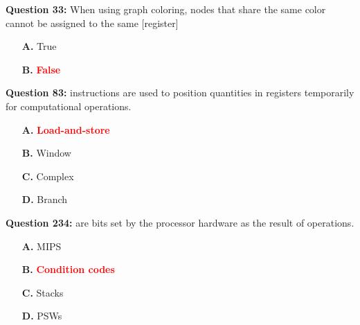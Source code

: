 \documentclass[12pt,a4paper]{article}
\begin{document}
\vspace{0.5cm}

\vspace{0.5cm}

\textbf{Question 33:} When using graph coloring, nodes that share the same color cannot be assigned to the same [register]

\begin{itemize}
    \item[\textbf{A.}] True
    \item[\textbf{B.}] \textcolor{red}{\textbf{False}}
\end{itemize}

\vspace{0.5cm}

\vspace{0.5cm}

\textbf{Question 83:} \underline{\hspace{1.5cm}} instructions are used to position quantities in registers temporarily for computational operations.

\begin{itemize}
    \item[\textbf{A.}] \textcolor{red}{\textbf{Load-and-store}}
    \item[\textbf{B.}] Window
    \item[\textbf{C.}] Complex
    \item[\textbf{D.}] Branch
\end{itemize}

\vspace{0.5cm}

\vspace{0.5cm}

\vspace{0.5cm}

\textbf{Question 234:} \underline{\hspace{1.5cm}} are bits set by the processor hardware as the result of operations.

\begin{itemize}
    \item[\textbf{A.}] MIPS
    \item[\textbf{B.}] \textcolor{red}{\textbf{Condition codes}}
    \item[\textbf{C.}] Stacks
    \item[\textbf{D.}] PSWs
\end{itemize}

\vspace{0.5cm}
\end{document}

